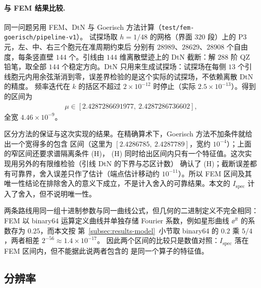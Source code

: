 \paragraph{与 FEM 结果比较.}
同一问题另用 FEM、DtN 与 Goerisch 方法计算（\texttt{test/\allowbreak fem-goerisch/\allowbreak pipeline-v1}）。
试探场取 $h=1/48$ 的网格（界面 $320$ 段）上的 P3 元，左、中、右三个胞元在准周期约束后
分别有 $28989$、$28629$、$28908$ 个自由度，每条竖直壁 $144$ 个。引线由 $144$ 维离散壁迹上的
DtN 截断：解 $288$ 阶 QZ 铅笔，取全部 $144$ 个稳定方向。DtN 只用来生成试探场：试探场在每侧
$13$ 个引线胞元内用余弦渐消到零，误差界检验的是这个实际的试探场，不依赖离散 DtN 的精度。
频率迭代在 $k$ 的括区不超过 $2\times10^{-12}$ 时停止（实际 $2.5\times10^{-13}$）。得到的区间为
\begin{align*}
  \mu\in[2.4287286691977,\ 2.4287286736602],
\end{align*}
全宽 $4.46\times10^{-9}$。

区分方法的保证与这次实现的结果。在精确算术下，Goerisch 方法不加条件就给出一个宽得多的包含
区间（这里为 $[2.4286785,\ 2.4287789]$，宽约 $10^{-4}$）；上面的窄区间还要求谱隔离条件 (H)，
(H) 同时给出区间内只有一个特征值。这次实现用另外的有限维检验（引线 DtN 的下界与芯区计数）
确认了 (H)；截断误差都有可靠界，舍入误差只作了估计（端点估计移动约 $10^{-11}$）。所以 FEM
区间及其唯一性结论在排除舍入的意义下成立，不是计入舍入的可靠结果。本文的
$I_{\mathrm{spec}}$ 计入了舍入，但不说明唯一性。

两条路线用同一组十进制参数与同一曲线公式，但几何的二进制定义不完全相同：FEM 以 binary64
运算定义曲线并单独存储 Fourier 系数，例如星形曲线 $\ee^{\ii t}$ 的系数存为 $0.25$，而本文按
第~\ref{subsec:results-model}~小节取 binary64 的 $0.2$ 乘 $5/4$，两者相差 $2^{-56}\approx1.4\times10^{-17}$。
因此两个区间的比较只是数值对照：$I_{\mathrm{spec}}$ 落在 FEM 区间内，但不能据此说两者包含的
是同一个算子的特征值。

\subsection{分辨率}
\label{subsec:results-resolution}

